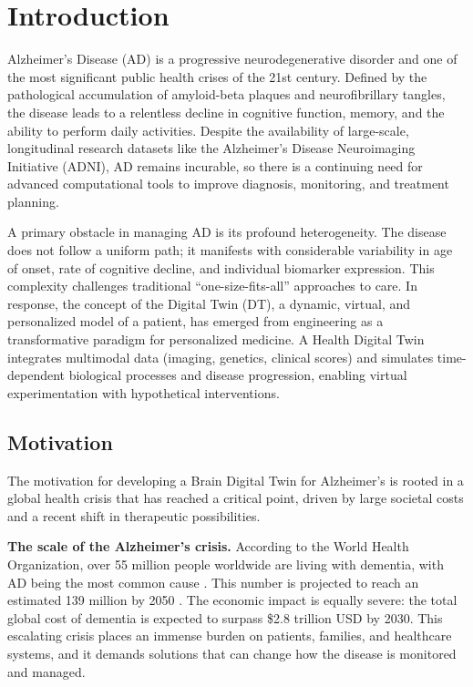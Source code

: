 \documentclass[pdflatex,sn-mathphys-num]{sn-jnl}%
\theoremstyle{thmstyleone}%
\theoremstyle{thmstyletwo}%
\theoremstyle{thmstylethree}%
\begin{document}
\maketitle

\section{Introduction}\label{sec1}

Alzheimer's Disease (AD) is a progressive neurodegenerative disorder and
one of the most significant public health crises of the 21st century.
Defined by the pathological accumulation of amyloid-beta plaques and
neurofibrillary tangles, the disease leads to a relentless decline in
cognitive function, memory, and the ability to perform daily activities.
Despite the availability of large-scale, longitudinal research datasets
like the Alzheimer's Disease Neuroimaging Initiative (ADNI), AD remains
incurable, so there is a continuing need for advanced computational
tools to improve diagnosis, monitoring, and treatment planning.

A primary obstacle in managing AD is its profound heterogeneity. The
disease does not follow a uniform path; it manifests with considerable
variability in age of onset, rate of cognitive decline, and individual
biomarker expression. This complexity challenges traditional
``one-size-fits-all'' approaches to care. In response, the concept of
the Digital Twin (DT), a dynamic, virtual, and personalized model of a
patient, has emerged from engineering as a transformative paradigm for
personalized medicine. A Health Digital Twin integrates multimodal data
(imaging, genetics, clinical scores) and simulates time-dependent
biological processes and disease progression, enabling virtual
experimentation with hypothetical interventions.

\subsection{Motivation}\label{motivation}
The motivation for developing a Brain Digital Twin for Alzheimer's is
rooted in a global health crisis that has reached a critical point,
driven by large societal costs and a recent shift in therapeutic
possibilities.

\textbf{The scale of the Alzheimer's crisis.} According to the World
Health Organization, over 55 million people worldwide are living with
dementia, with AD being the most common cause \cite{bib21}. This number is
projected to reach an estimated 139 million by 2050 \cite{bib22}. The
economic impact is equally severe: the total global cost of dementia is
expected to surpass \$2.8 trillion USD by 2030. This escalating crisis
places an immense burden on patients, families, and healthcare systems,
and it demands solutions that can change how the disease is monitored
and managed.
\end{document}
